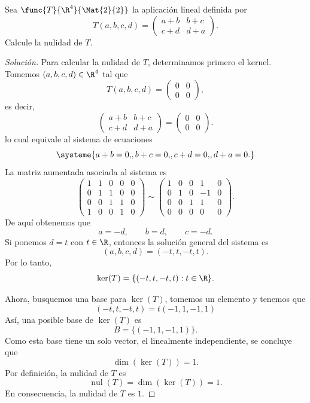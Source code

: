 \documentclass[a4,11pt]{aleph-notas}
\begin{document}
\encabezado

\begin{ejer}
	Sea $\func{T}{\R^4}{\Mat{2}{2}}$ la aplicación lineal definida por
	\[
		T(a,b,c,d)=
		\begin{pmatrix}
			a+b & b+c\\
			c+d & d+a
		\end{pmatrix}.
	\]
	Calcule la nulidad de $T$.
\end{ejer}

\begin{proof}[Solución]
	Para calcular la nulidad de $T$, determinamos primero el kernel. Tomemos $(a,b,c,d)\in\R^4$ tal que
	\[
		T(a,b,c,d)=
		\begin{pmatrix}
			0 & 0\\
			0 & 0
		\end{pmatrix},
	\]
    es decir,
    \[
        \begin{pmatrix}
			a+b & b+c\\
			c+d & d+a
		\end{pmatrix}=
        \begin{pmatrix}
            0 & 0\\
            0 & 0
        \end{pmatrix}.
    \]
	lo cual equivale al sistema de ecuaciones
	\[
		\systeme{
		a+b = 0{,},
		b+c = 0{,},
		c+d = 0{,},
		d+a = 0{.}
		}
	\]
	La matriz aumentada asociada al sistema es
	\[
		\left(
		\begin{array}{cccc|c}
			1 & 1 & 0 & 0 & 0\\
			0 & 1 & 1 & 0 & 0\\
			0 & 0 & 1 & 1 & 0\\
			1 & 0 & 0 & 1 & 0
		\end{array}
		\right)
		\sim
		\left(
		\begin{array}{cccc|c}
			1 & 0 & 0 & 1 & 0\\
			0 & 1 & 0 & -1 & 0\\
			0 & 0 & 1 & 1 & 0\\
			0 & 0 & 0 & 0 & 0
		\end{array}
		\right).
	\]
	De aquí obtenemos que
	\[
		a=-d,\qquad b=d,\qquad c=-d.
	\]
	Si ponemos $d=t$ con $t\in\R$, entonces la solución general del sistema es
	\[
		(a,b,c,d)=(-t,t,-t,t).
	\]
	Por lo tanto,
	\[
		\ker(T)=\{(-t,t,-t,t): t\in\R\}.
	\]

    Ahora, busquemos una base para $\ker(T)$, tomemos un elemento y tenemos que
    \[
        (-t,t,-t,t) = t (-1,1,-1,1)
    \]
	Así, una posible base de $\ker(T)$ es
	\[
		B=\{(-1,1,-1,1)\}.
	\]
	Como esta base tiene un solo vector, el linealmente independiente, se concluye que
	\[
		\dim(\ker(T))=1.
	\]
	Por definición, la nulidad de $T$ es
	\[
		\operatorname{nul}(T)=\dim(\ker(T))=1.
	\]
	En consecuencia, la nulidad de $T$ es $1$.\qedhere
\end{proof}
\end{document}
